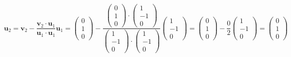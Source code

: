 \documentclass[a3paper,12pt]{extarticle} %
\begin{document}
\begin{enumerate}
\begin{enumerate}
\[            \mathbf{u}_2 = \mathbf{v}_2 - \frac{\mathbf{v}_2 \cdot \mathbf{u}_1}{\mathbf{u}_1 \cdot \mathbf{u}_1} \mathbf{u}_1 = \begin{pmatrix} 0 \\ 1 \\ 0 \end{pmatrix} - \frac{\begin{pmatrix} 0 \\ 1 \\ 0 \end{pmatrix} \cdot \begin{pmatrix} 1 \\ -1 \\ 0 \end{pmatrix}}{\begin{pmatrix} 1 \\ -1 \\ 0 \end{pmatrix} \cdot \begin{pmatrix} 1 \\ -1 \\ 0 \end{pmatrix}} \begin{pmatrix} 1 \\ -1 \\ 0 \end{pmatrix} = \begin{pmatrix} 0 \\ 1 \\ 0 \end{pmatrix} - \frac{0}{2} \begin{pmatrix} 1 \\ -1 \\ 0 \end{pmatrix} = \begin{pmatrix} 0 \\ 1 \\ 0 \end{pmatrix}
        \]
        \[
\]
\end{enumerate}
\end{enumerate}
\end{document}
